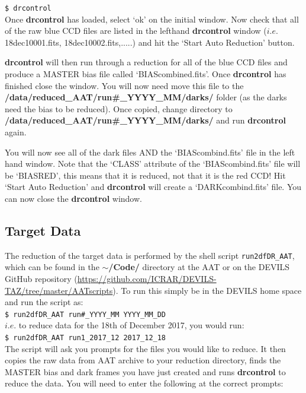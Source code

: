\documentclass[12pt]{article}
\begin{document}
\texttt{\$ drcontrol} \\

Once \textbf{drcontrol} has loaded, select `ok' on the initial window. Now check that all of the raw blue CCD files are listed in the lefthand \textbf{drcontrol} window ($i.e.$ 18dec10001.fits, 18dec10002.fits,.....) and hit the `Start Auto Reduction' button. 

\textbf{drcontrol} will then run through a reduction for all of the blue CCD files and produce a MASTER bias file called `BIAScombined.fits'. Once \textbf{drcontrol} has finished close the window. You will now need move this file to the \textbf{/data/reduced\_AAT/run\#\_YYYY\_MM/darks/} folder (as the darks need the bias to be reduced). Once copied,  change directory to \textbf{/data/reduced\_AAT/run\#\_YYYY\_MM/darks/} and run \textbf{drcontrol} again.

You will now see all of the dark files AND the `BIAScombind.fits' file in the left hand window. Note that the `CLASS' attribute of the `BIAScombind.fits' file will be `BIASRED', this means that it is reduced, not that it is the red CCD! Hit `Start Auto Reduction' and \textbf{drcontrol} will create a `DARKcombind.fits' file.  You can now close the \textbf{drcontrol} window.
 

\subsection{Target Data}

The reduction of the target data is performed by the shell script \texttt{run2dfDR\_AAT}, which can be found in the \textbf{$\sim$/Code/} directory at the AAT or on the DEVILS GitHub repository (\url{https://github.com/ICRAR/DEVILS-TAZ/tree/master/AATscripts}). To run this simply be in the DEVILS home space and run the script as:\\

\texttt{\$ run2dfDR\_AAT run\#\_YYYY\_MM YYYY\_MM\_DD}\\

$i.e.$ to reduce data for the 18th of December 2017, you would run:\\    

\texttt{\$ run2dfDR\_AAT run1\_2017\_12 2017\_12\_18}\\

The script will ask you prompts for the files you would like to reduce. It then copies the raw data from AAT archive to your reduction directory, finds the MASTER bias and dark frames you have just created and runs \textbf{drcontrol} to reduce the data. You will need to enter the following at the correct prompts:\\
\end{document}
